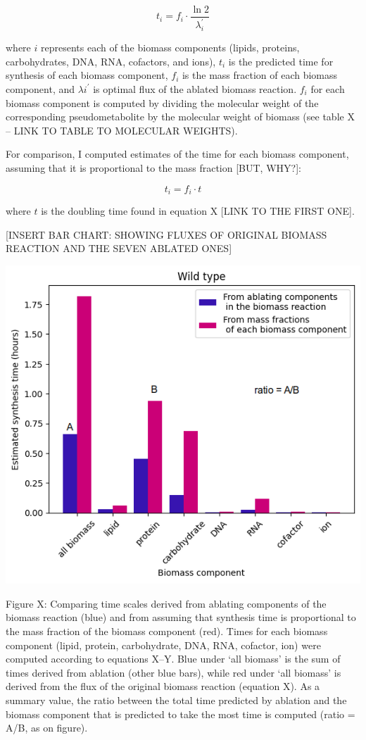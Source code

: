\begin{equation}
  t_{i} = f_{i} \cdot \frac{\ln 2}{\lambda_{i}^{\prime}}
\end{equation}

where $i$ represents each of the biomass components (lipids, proteins, carbohydrates, DNA, RNA, cofactors, and ions), $t_{i}$ is the predicted time for synthesis of each biomass component, $f_{i}$ is the mass fraction of each biomass component, and $\lambda{i}^{\prime}$ is optimal flux of the ablated biomass reaction.
$f_{i}$ for each biomass component is computed by dividing the molecular weight of the corresponding pseudometabolite by the molecular weight of biomass (see table X -- LINK TO TABLE TO MOLECULAR WEIGHTS).

For comparison, I computed estimates of the time for each biomass component, assuming that it is proportional to the mass fraction [BUT, WHY?]:

\begin{equation}
  t_{i} = f_{i} \cdot t
\end{equation}

where $t$ is the doubling time found in equation X [LINK TO THE FIRST ONE].

[INSERT BAR CHART: SHOWING FLUXES OF ORIGINAL BIOMASS REACTION AND THE SEVEN ABLATED ONES]

\begin{center}
\includegraphics[width=.9\linewidth]{ablation_example_ratio.png}
\end{center} Figure X: Comparing time scales derived from ablating components of the biomass reaction (blue) and from assuming that synthesis time is proportional to the mass fraction of the biomass component (red).  Times for each biomass component (lipid, protein, carbohydrate, DNA, RNA, cofactor, ion) were computed according to equations X--Y.  Blue under `all biomass' is the sum of times derived from ablation (other blue bars), while red under `all biomass' is derived from the flux of the original biomass reaction (equation X).  As a summary value, the ratio between the total time predicted by ablation and the biomass component that is predicted to take the most time is computed (ratio = A/B, as on figure).

